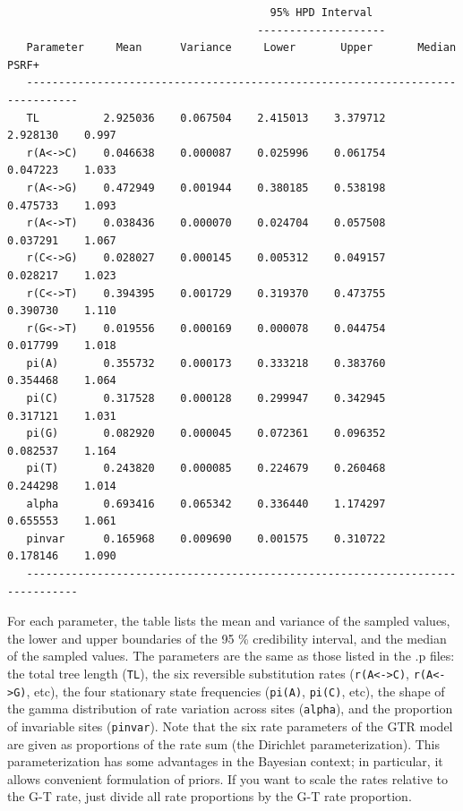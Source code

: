 \documentclass[12pt]{book}
\begin{document}
\begin{singlespacing}
\scriptsize
\begin{verbatim}
                                         95% HPD Interval
                                       --------------------
   Parameter     Mean      Variance     Lower       Upper       Median     PSRF+ 
   ------------------------------------------------------------------------------
   TL          2.925036    0.067504    2.415013    3.379712    2.928130    0.997
   r(A<->C)    0.046638    0.000087    0.025996    0.061754    0.047223    1.033
   r(A<->G)    0.472949    0.001944    0.380185    0.538198    0.475733    1.093
   r(A<->T)    0.038436    0.000070    0.024704    0.057508    0.037291    1.067
   r(C<->G)    0.028027    0.000145    0.005312    0.049157    0.028217    1.023
   r(C<->T)    0.394395    0.001729    0.319370    0.473755    0.390730    1.110
   r(G<->T)    0.019556    0.000169    0.000078    0.044754    0.017799    1.018
   pi(A)       0.355732    0.000173    0.333218    0.383760    0.354468    1.064
   pi(C)       0.317528    0.000128    0.299947    0.342945    0.317121    1.031
   pi(G)       0.082920    0.000045    0.072361    0.096352    0.082537    1.164
   pi(T)       0.243820    0.000085    0.224679    0.260468    0.244298    1.014
   alpha       0.693416    0.065342    0.336440    1.174297    0.655553    1.061
   pinvar      0.165968    0.009690    0.001575    0.310722    0.178146    1.090
   ------------------------------------------------------------------------------
\end{verbatim}
\normalsize
\end{singlespacing}

For each parameter, the table lists the mean and variance of the sampled values, the lower and upper 
boundaries of the 95 \% credibility interval, and the median of the sampled values. The parameters are the 
same as those listed in the .p files: the total tree length (\texttt{TL}), the six reversible substitution 
rates (\texttt{r(A<->C)}, \texttt{r(A<->G)}, etc), the four stationary state frequencies (\texttt{pi(A)}, 
\texttt{pi(C)}, etc), the shape of the gamma distribution of rate variation across sites (\texttt{alpha}), 
and the proportion of invariable sites (\texttt{pinvar}). Note that the six rate parameters of the GTR model 
are given as proportions of the rate sum (the Dirichlet parameterization). This parameterization has some 
advantages in the Bayesian context; in particular, it allows convenient formulation of priors. If you want 
to scale the rates relative to the G-T rate, just divide all rate proportions by the G-T rate proportion.
\end{document}
